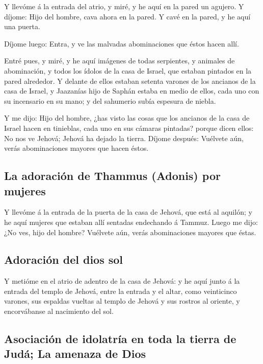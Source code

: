  Y llevóme á la entrada del atrio, y miré, y he aquí en la
pared un agujero.  Y díjome: Hijo del hombre, cava ahora
en la pared. Y cavé en la pared, y he aquí una puerta.

 Díjome luego: Entra, y ve las malvadas abominaciones que
éstos hacen allí.

 Entré pues, y miré, y he aquí imágenes de todas
serpientes, y animales de abominación, y todos los ídolos de la casa de
Israel, que estaban pintados en la pared alrededor.  Y
delante de ellos estaban setenta varones de los ancianos de la casa de
Israel, y Jaazanías hijo de Saphán estaba en medio de ellos, cada uno
con su incensario en su mano; y del sahumerio subía espesura de niebla.

 Y me dijo: Hijo del hombre, ¿has visto las cosas que los
ancianos de la casa de Israel hacen en tinieblas, cada uno en sus
cámaras pintadas? porque dicen ellos: No nos ve Jehová; Jehová ha dejado
la tierra.  Díjome después: Vuélvete aún, verás
abominaciones mayores que hacen éstos.

\hypertarget{la-adoraciuxf3n-de-thammus-adonis-por-mujeres}{%
\subsection{La adoración de Thammus (Adonis) por
mujeres}\label{la-adoraciuxf3n-de-thammus-adonis-por-mujeres}}

 Y llevóme á la entrada de la puerta de la casa de
Jehová, que está al aquilón; y he aquí mujeres que estaban allí sentadas
endechando á Tammuz.  Luego me dijo: ¿No ves, hijo del
hombre? Vuélvete aún, verás abominaciones mayores que éstas.

\hypertarget{adoraciuxf3n-del-dios-sol}{%
\subsection{Adoración del dios sol}\label{adoraciuxf3n-del-dios-sol}}

 Y metióme en el atrio de adentro de la casa de Jehová: y
he aquí junto á la entrada del templo de Jehová, entre la entrada y el
altar, como veinticinco varones, sus espaldas vueltas al templo de
Jehová y sus rostros al oriente, y encorvábanse al nacimiento del sol.

\hypertarget{asociaciuxf3n-de-idolatruxeda-en-toda-la-tierra-de-juduxe1-la-amenaza-de-dios}{%
\subsection{Asociación de idolatría en toda la tierra de Judá; La
amenaza de
Dios}\label{asociaciuxf3n-de-idolatruxeda-en-toda-la-tierra-de-juduxe1-la-amenaza-de-dios}}

